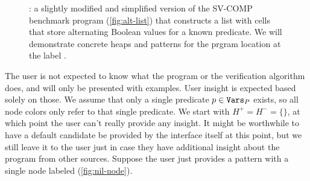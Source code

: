 \begin{figure}
  \centering
  
  \caption{\altlistsimplified: a slightly modified and simplified version of the SV-COMP benchmark program \altlist (\autoref{fig:alt-list}) that constructs a list with cells that store alternating Boolean values for a known predicate. We will demonstrate concrete heaps and patterns for the prgram location at the label \checkpoint.}
  \label{fig:alt-list-simplified}
\end{figure}

The user is not expected to know what the program or the verification algorithm does, and will only be presented with examples. User insight is expected based solely on those. We assume that only a single predicate $p \in \mathtt{Vars}_P$ exists, so all node colors only refer to that single predicate. We start with $H^{+} = H^{-} = \{\}$, at which point the user can't really provide any insight. It might be worthwhile to have a default candidate be provided by the interface itself at this point, but we still leave it to the user just in case they have additional insight about the program from other sources. Suppose the user just provides a pattern with a single node labeled \nilconst (\autoref{fig:nil-node}).

